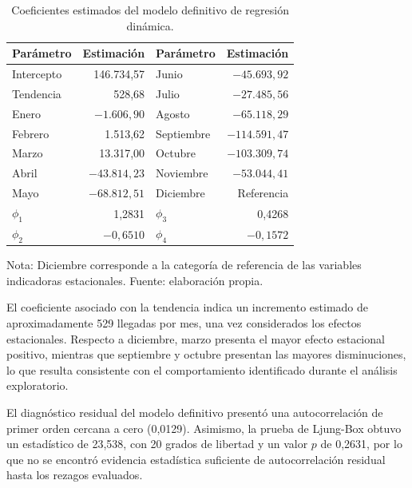\documentclass[12pt]{article}
\begin{document}
\begin{table}[H]
    \centering
    \caption{Coeficientes estimados del modelo definitivo
    de regresión dinámica.}
    \label{tab:coeficientes_finales}
    \begin{tabular}{lr lr}
        \hline
        Parámetro & Estimación & Parámetro & Estimación \\
        \hline
        Intercepto & 146.734,57 & Junio & $-45.693,92$ \\
        Tendencia & 528,68 & Julio & $-27.485,56$ \\
        Enero & $-1.606,90$ & Agosto & $-65.118,29$ \\
        Febrero & 1.513,62 & Septiembre & $-114.591,47$ \\
        Marzo & 13.317,00 & Octubre & $-103.309,74$ \\
        Abril & $-43.814,23$ & Noviembre & $-53.044,41$ \\
        Mayo & $-68.812,51$ & Diciembre & Referencia \\
        \hline
        $\phi_1$ & 1,2831 & $\phi_3$ & 0,4268 \\
        $\phi_2$ & $-0,6510$ & $\phi_4$ & $-0,1572$ \\
        \hline
    \end{tabular}

    \begin{flushleft}
        \footnotesize
        Nota: Diciembre corresponde a la categoría de 
        referencia de las variables indicadoras 
        estacionales. Fuente: elaboración propia.
    \end{flushleft}
\end{table}

El coeficiente asociado con la tendencia indica un 
incremento estimado de aproximadamente 529 llegadas 
por mes, una vez considerados los efectos estacionales. 
Respecto a diciembre, marzo presenta el mayor efecto 
estacional positivo, mientras que septiembre y octubre 
presentan las mayores disminuciones, lo que resulta 
consistente con el comportamiento identificado durante 
el análisis exploratorio.

El diagnóstico residual del modelo definitivo presentó 
una autocorrelación de primer orden cercana a cero 
(0,0129). Asimismo, la prueba de Ljung-Box obtuvo un 
estadístico de 23,538, con 20 grados de libertad y 
un valor $p$ de 0,2631, por lo que no se encontró 
evidencia estadística suficiente de autocorrelación 
residual hasta los rezagos evaluados.
\end{document}

